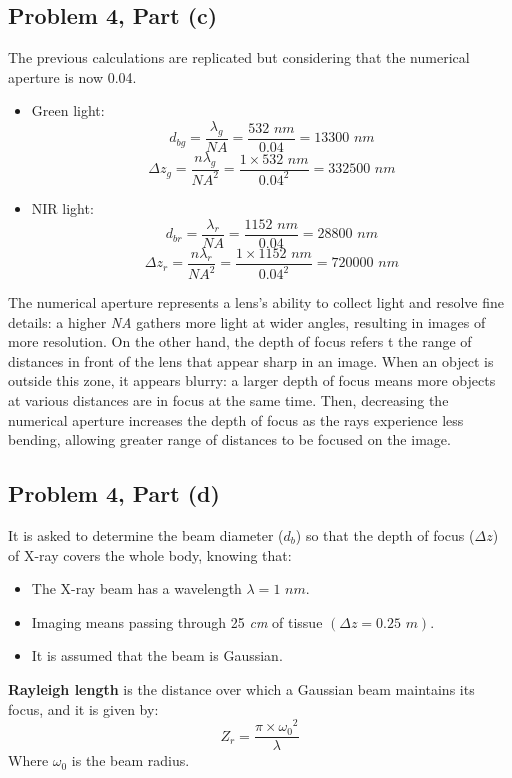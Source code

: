 \documentclass[12pt]{article}
\begin{document}
\subsection*{Problem 4, Part (c)}
The previous calculations are replicated but considering that the numerical aperture is now 0.04.
\begin{itemize}
    \item Green light:
\[
d_{bg} = \frac{\lambda_g}{NA} = \frac{532 \textit{ nm}}{0.04} = 13300 \textit{ nm}
\]
\[
\Delta z_g = \frac{n \lambda_g}{{NA}^2} = \frac{1 \times 532 \textit{ nm}}{{0.04}^2} = 332500 \textit{ nm}
\]
    \item NIR light:
\[
d_{br} = \frac{\lambda_r}{NA} = \frac{1152 \textit{ nm}}{0.04} = 28800 \textit{ nm}
\]
\[
\Delta z_r = \frac{n \lambda_r}{{NA}^2} = \frac{1 \times 1152 \textit{ nm}}{{0.04}^2} = 720000 \textit{ nm}
\]
\end{itemize}
The numerical aperture represents a lens's ability to collect light and resolve fine details: a higher \textit{NA} gathers more light at wider angles, resulting in images of more resolution. On the other hand, the depth of focus refers t the range of distances in front of the lens that appear sharp in an image. When an object is outside this zone, it appears blurry: a larger depth of focus means more objects at various distances are in focus at the same time. Then, decreasing the numerical aperture increases the depth of focus as the rays experience less bending, allowing greater range of distances to be focused on the image.
\subsection*{Problem 4, Part (d)}
It is asked to determine the beam diameter ($d_b$) so that the depth of focus ($\Delta z$) of X-ray covers the whole body, knowing that:
\begin{itemize}
    \item The X-ray beam has a wavelength $\lambda = 1 \textit{ nm}$.
    \item Imaging means passing through 25 {\textit{cm}} of tissue $(\Delta z = 0.25 \textit{ m})$.
    \item It is assumed that the beam is Gaussian.
\end{itemize}
\textbf{Rayleigh length} is the distance over which a Gaussian beam maintains its focus, and it is given by:
\[ 
    Z_r = \frac{\pi \times {\omega_0}^2}{\lambda}
\]
Where $\omega_0$ is the beam radius.
\end{document}
